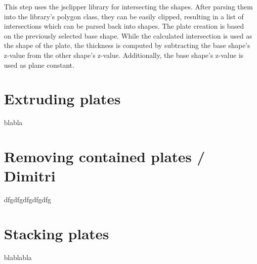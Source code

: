 \documentclass[../ClassicThesis.tex]{subfiles}
\begin{document}
This step uses the jsclipper library for intersecting the shapes. After parsing them into the library's polygon class, they can be easily clipped, resulting in a list of intersections which can be parsed back into shapes. The plate creation is based on the previously selected base shape. While the calculated intersection is used as the shape of the plate, the thickness is computed by subtracting the base shape's z-value from the other shape's z-value. Additionally, the base shape's z-value is used as plane constant.

\section{Extruding plates}

blabla

\section{Removing contained plates / Dimitri}

dfgdfgdfgdfgdfg

\section{Stacking plates}

blablabla


\end{document}

